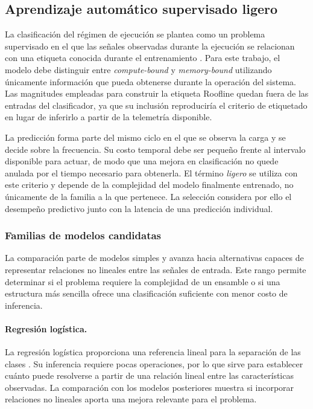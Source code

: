 \subsection{Aprendizaje automático supervisado ligero}
\label{sec:marco-ml-ligero}

La clasificación del régimen de ejecución se plantea como un problema
supervisado en el que las señales observadas durante la ejecución se relacionan
con una etiqueta conocida durante el entrenamiento
\cite[Ch.~2]{James2021}. Para este trabajo, el modelo debe distinguir entre
\textit{compute-bound} y \textit{memory-bound} utilizando únicamente
información que pueda obtenerse durante la operación del sistema. Las
magnitudes empleadas para construir la etiqueta Roofline quedan fuera de las
entradas del clasificador, ya que su inclusión reproduciría el criterio de
etiquetado en lugar de inferirlo a partir de la telemetría disponible.

La predicción forma parte del mismo ciclo en el que se observa la carga y se
decide sobre la frecuencia. Su costo temporal debe ser pequeño frente al
intervalo disponible para actuar, de modo que una mejora en clasificación no
quede anulada por el tiempo necesario para obtenerla. El término
\textit{ligero} se utiliza con este criterio y depende de la complejidad del
modelo finalmente entrenado, no únicamente de la familia a la que pertenece.
La selección considera por ello el desempeño predictivo junto con la latencia
de una predicción individual.

\subsubsection{Familias de modelos candidatas}
\label{sec:marco-familias-modelos}

La comparación parte de modelos simples y avanza hacia alternativas capaces de
representar relaciones no lineales entre las señales de entrada. Este rango
permite determinar si el problema requiere la complejidad de un ensamble o si
una estructura más sencilla ofrece una clasificación suficiente con menor
costo de inferencia.

\paragraph{Regresión logística.}

La regresión logística proporciona una referencia lineal para la separación de
las clases \cite[Ch.~4]{James2021}. Su inferencia requiere pocas operaciones,
por lo que sirve para establecer cuánto puede resolverse a partir de una
relación lineal entre las características observadas. La comparación con los
modelos posteriores muestra si incorporar relaciones no lineales aporta una
mejora relevante para el problema.

